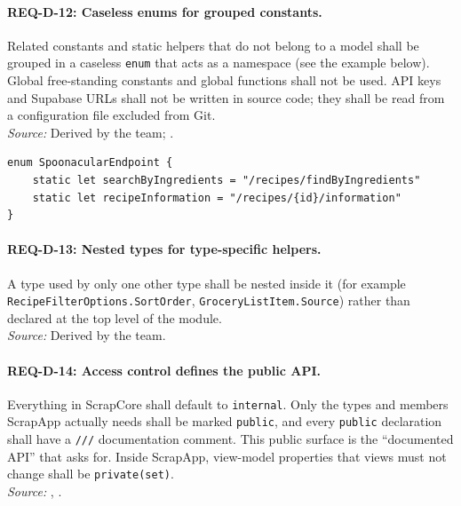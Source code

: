 \paragraph{REQ-D-12: Caseless enums for grouped constants.}
 Related constants and static helpers that do not belong to a model shall be grouped in a caseless \texttt{enum} that acts as a namespace (see the example below). Global free-standing constants and global functions shall not be used. API keys and Supabase URLs shall not be written in source code; they shall be read from a configuration file excluded from Git.\\
\textit{Source:} Derived by the team; .
{\footnotesize
\begin{verbatim}
enum SpoonacularEndpoint {
    static let searchByIngredients = "/recipes/findByIngredients"
    static let recipeInformation = "/recipes/{id}/information"
}
\end{verbatim}
}

\paragraph{REQ-D-13: Nested types for type-specific helpers.}
 A type used by only one other type shall be nested inside it (for example \texttt{RecipeFilterOptions.}\allowbreak\texttt{SortOrder}, \texttt{GroceryListItem.}\allowbreak\texttt{Source}) rather than declared at the top level of the module.\\
\textit{Source:} Derived by the team.

\paragraph{REQ-D-14: Access control defines the public API.}
 Everything in ScrapCore shall default to \texttt{internal}. Only the types and members ScrapApp actually needs shall be marked \texttt{public}, and every \texttt{public} declaration shall have a \texttt{///} documentation comment. This public surface is the ``documented API'' that  asks for. Inside ScrapApp, view-model properties that views must not change shall be \texttt{private(set)}.\\
\textit{Source:} , .

